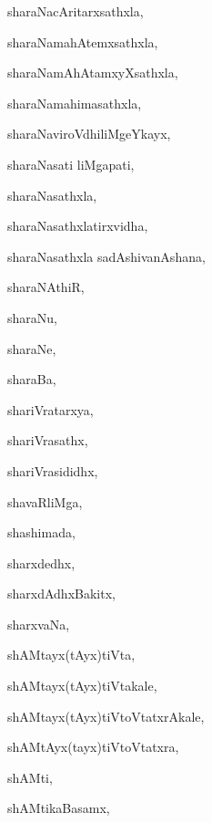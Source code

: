 \begin{multicols}{3}
{\noindent
{sharaNacAritarxsathxla}, \pageref{sharaNacAritarxsathxla}

\noindent
{sharaNamahAtemxsathxla}, \pageref{sharaNamahAtemxsathxla}

\noindent
{sharaNamAhAtamxyXsathxla}, \pageref{sharaNamAhAtamxyXsathxla}

\noindent
{sharaNamahimasathxla}, \pageref{sharaNamahimasathxla}

\noindent
{sharaNaviroVdhiliMgeYkayx}, \pageref{sharaNaviroVdhiliMgeYkayx}

\noindent
{sharaNasati liMgapati}, \pageref{sharaNasatiliMgapati}

\noindent
{sharaNasathxla}, \pageref{sharaNasathxla}

\noindent
{sharaNasathxlatirxvidha}, \pageref{sharaNasathxlatirxvidha}

\noindent
{sharaNasathxla sadAshivanAshana}, \pageref{sharaNasathxla sadAshivanAshana}

\noindent
{sharaNAthiR}, \pageref{sharaNAthiR}

\noindent
{sharaNu}, \pageref{sharaNu}

\noindent
{sharaNe}, \pageref{sharaNe}

\noindent
{sharaBa}, \pageref{sharaBa}

\noindent
{shariVratarxya}, \pageref{shariVratarxya}

\noindent
{shariVrasathx}, \pageref{shariVrasathx}

\noindent
{shariVrasididhx}, \pageref{shariVrasididhx}

\noindent
{shavaRliMga}, \pageref{shavaRliMga}

\noindent
{shashimada}, \pageref{shashimada}

\noindent
{sharxdedhx}, \pageref{sharxdedhx}

\noindent
{sharxdAdhxBakitx}, \pageref{sharxdAdhxBakitx}

\noindent
{sharxvaNa}, \pageref{sharxvaNa}

\noindent
{shAMtayx(tAyx)tiVta}, \pageref{shAMtayxtAyxtiVta}

\noindent
{shAMtayx(tAyx)tiVtakale}, \pageref{shAMtayxtAyxtiVtakale}

\noindent
{shAMtayx(tAyx)tiVtoVtatxrAkale}, \pageref{shAMtayxtAyxtiVtoVtatxrAkale}

\noindent
{shAMtAyx(tayx)tiVtoVtatxra}, \pageref{shAMtAyxtayxtiVtoVtatxra}

\noindent
{shAMti}, \pageref{shAMti}

\noindent
{shAMtikaBasamx}, \pageref{shAMtikaBasamx}

}
\end{multicols}
